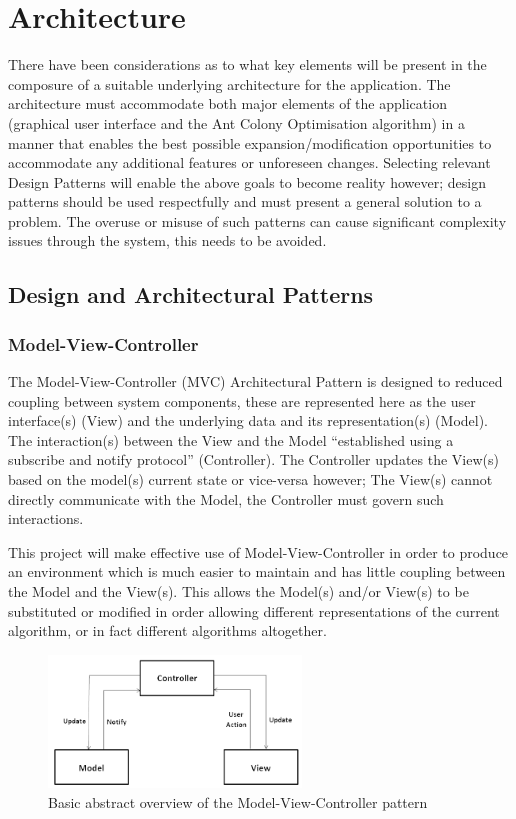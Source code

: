 \section{Architecture}

There have been considerations as to what key elements will be present in the composure of a suitable underlying architecture for the application. The architecture must accommodate both major elements of the application (graphical user interface and the Ant Colony Optimisation algorithm) in a manner that enables the best possible expansion/modification opportunities to accommodate any additional features or unforeseen changes. Selecting relevant Design Patterns will enable the above goals to become reality however; design patterns should be used respectfully and must present a general solution to a problem. The overuse or misuse of such patterns can cause significant complexity issues through the system, this needs to be avoided.

\subsection{Design and Architectural Patterns}

\subsubsection{Model-View-Controller}
\label{sssec:mvc}
\label{sec:patternsmvc}
The Model-View-Controller (MVC) Architectural Pattern is designed to reduced coupling between system components, these are represented here as the user interface(s) (View) and the underlying data and its representation(s) (Model). The interaction(s) between the View and the Model \enquote{established using a subscribe and notify protocol}\cite{gof:design:mvc} (Controller). The Controller updates the View(s) based on the model(s) current state or vice-versa however; The View(s) cannot directly communicate with the Model, the Controller must govern such interactions.

This project will make effective use of Model-View-Controller in order to produce an environment which is much easier to maintain and has little coupling between the Model and the View(s). This allows the Model(s) and/or View(s) to be substituted or modified in order allowing different representations of the current algorithm, or in fact different algorithms altogether. 

\begin{figure}[h]
\centering
\includegraphics[width=0.6\textwidth]{Images/design/mvc}
\caption[Model-View-Controller Overview]{Basic abstract overview of the Model-View-Controller pattern}
\end{figure}

